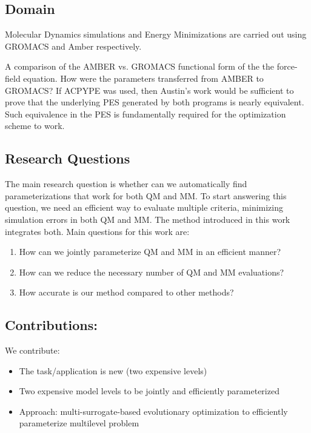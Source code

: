 \documentclass[preprint,12pt]{elsarticle}
\begin{document}
\subsection{Domain}

Molecular Dynamics simulations and Energy Minimizations are carried out using  GROMACS and Amber respectively.

A comparison of the AMBER vs. GROMACS functional form of the the force-field equation. How were the parameters transferred from AMBER to GROMACS? If ACPYPE was used, then Austin's work would be sufficient to prove that the underlying PES generated by both programs is nearly equivalent. Such equivalence in the PES is fundamentally required for the optimization scheme to work. 

\subsection{Research Questions}

The main research question is whether can we automatically find parameterizations that work for both QM and MM. To start answering this question, we need an efficient way to evaluate multiple criteria, minimizing simulation errors in both QM and MM. The method introduced in this work integrates both. Main questions for this work are:

\begin{enumerate}
    \item How can we jointly parameterize QM and MM in an efficient manner? \item How can we reduce the necessary number of QM and MM evaluations?
    \item How accurate is our method compared to other methods?
\end{enumerate}

\subsection{Contributions:}
We contribute:
\begin{itemize}
    \item The task/application is new (two expensive levels)
    \item Two expensive model levels to be jointly and efficiently parameterized
    \item Approach: multi-surrogate-based evolutionary optimization to efficiently parameterize multilevel problem
\end{itemize}
\end{document}
